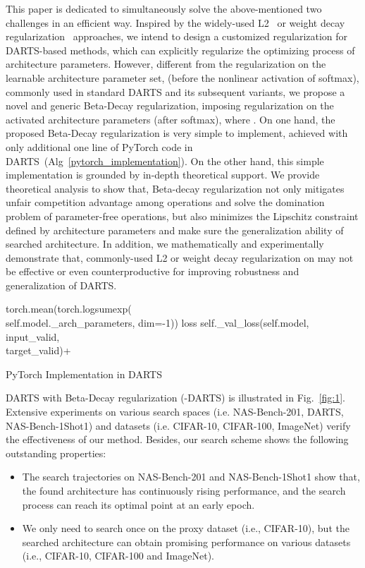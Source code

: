 \documentclass[10pt,twocolumn,letterpaper]{article}
\begin{document}
This paper is dedicated to simultaneously solve the above-mentioned two challenges in an efficient way. Inspired by the widely-used L2~\cite{cortes2012l2} or weight decay regularization~\cite{wd} approaches, we intend to design a customized regularization for DARTS-based methods, which can explicitly regularize the optimizing process of architecture parameters. However, different from the regularization on the learnable architecture parameter set,  (before the nonlinear activation of softmax), commonly used in standard DARTS and its subsequent variants, we propose a novel and generic Beta-Decay regularization, imposing regularization on the activated architecture parameters  (after softmax), where .
On one hand, the proposed Beta-Decay regularization is very simple to implement, achieved with only additional one line of PyTorch code in DARTS~(Alg~\ref{pytorch_implementation}). On the other hand, this simple implementation is grounded by in-depth theoretical support. We provide theoretical analysis to show that, Beta-decay regularization not only mitigates unfair competition advantage among operations and solve the domination problem of parameter-free operations, but also minimizes the Lipschitz constraint defined by architecture parameters and make sure the generalization ability of searched architecture. In addition, we mathematically and experimentally demonstrate that, commonly-used L2 or weight decay regularization on  may not be effective or even counterproductive for improving robustness and generalization of DARTS. 
\vspace{-6pt}
\begin{algorithm}[htb]
\label{alg:beta-decay code}   
\begin{algorithmic}[1] \STATE   torch.mean(torch.logsumexp( \\
\qquad \quad self.model.\_arch\_parameters, dim=-1))
\STATE loss  self.\_val\_loss(self.model, input\_valid, \\ 
\qquad \quad target\_valid)+
\end{algorithmic}  
\caption{PyTorch Implementation in DARTS}
\label{pytorch_implementation}
\end{algorithm} 
\vspace{-12pt}

DARTS with Beta-Decay regularization (-DARTS) is illustrated in Fig.~\ref{fig:1}. Extensive experiments on various search spaces (i.e. NAS-Bench-201, DARTS, NAS-Bench-1Shot1) and datasets (i.e. CIFAR-10, CIFAR-100, ImageNet) verify the effectiveness of our method. Besides, our search scheme shows the following outstanding properties:
 \begin{itemize}
\vspace{-8pt}
\item The search trajectories on NAS-Bench-201 and NAS-Bench-1Shot1 show that, the found architecture has continuously rising performance, and the search process can reach its optimal point at an early epoch.
\vspace{-8pt}
\item We only need to search once on the proxy dataset (i.e., CIFAR-10), but the searched architecture can obtain promising performance on various datasets (i.e., CIFAR-10, CIFAR-100 and ImageNet).
\end{itemize}
\end{document}
